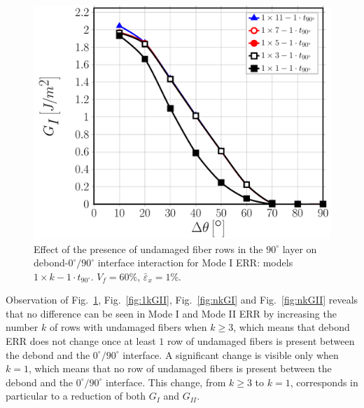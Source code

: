 \documentclass[Review,sagev,times]{sagej}
\begin{document}
\begin{figure}[!htb]
\centering
\includegraphics[height=0.375\textheight]{1xk-1-vf60-GI.pdf}
\caption{Effect of the presence of undamaged fiber rows in the $90^{\circ}$ layer on debond-$0^{\circ}/90^{\circ}$ interface interaction for Mode I ERR: models $1\times k-1\cdot t_{90^{\circ}}$. $V_{f}=60\%$, $\bar{\varepsilon}_{x}=1\%$.}\label{fig:1kGI}
\end{figure}

Observation of Fig.~\ref{fig:1kGI}, Fig.~\ref{fig:1kGII}, Fig.~\ref{fig:nkGI} and Fig.~\ref{fig:nkGII} reveals that no difference can be seen in Mode I and Mode II ERR by increasing the number $k$ of rows with undamaged fibers when $k\geq3$, which means that debond ERR does not change once at least $1$ row of undamaged fibers is present between the debond and the $0^{\circ}/90^{\circ}$ interface. A significant change is visible only when $k=1$, which means that no row of undamaged fibers is present between the debond and the $0^{\circ}/90^{\circ}$ interface. This change, from $k\geq3$ to $k=1$, corresponds in particular to a reduction of both $G_{I}$ and $G_{II}$.
\end{document}
